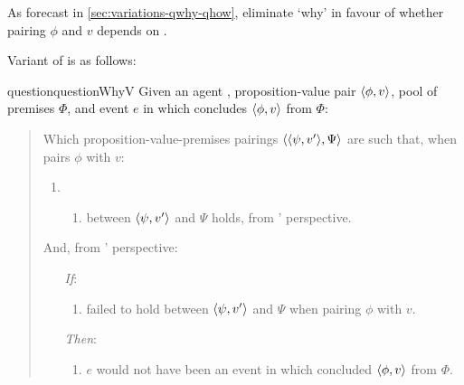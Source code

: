 \begin{note}
  As forecast in \autoref{sec:variations-qwhy-qhow}, eliminate `why' in favour of whether pairing \(\phi\) and \(v\) depends on \ros{}.
\end{note}

\begin{note}
  Variant of \qWhyV{} is as follows:

    \begin{restatable}[\qWhyV{}]{question}{questionWhyV}
    \label{q:why:v}
    Given an agent \vAgent{}, proposition-value pair \(\langle \phi, v \rangle\), pool of premises \(\Phi\), and event \(e\) in which \vAgent{} concludes \(\langle \phi, v \rangle\) from \(\Phi\):

    \begin{quote}
      Which proposition-value-premises pairings \(\langle \langle \psi, v' \rangle, \Psi \rangle\) are such that, when \vAgent{} pairs \(\phi\) with \(v\):

      \begin{enumerate}[label=]
      \item
        \begin{enumerate}[label=\alph*., ref=(\alph*), series=qWhyVDef]
        \item
          \label{q:why:v:a}
           between \(\langle \psi, v' \rangle\) and \(\Psi\) holds, from \vAgent{}' perspective.
        \end{enumerate}
      \end{enumerate}

      And, from \vAgent{}' perspective:

      \begin{enumerate}
      \item[\emph{If}:]
        \begin{enumerate}[label=\alph*., ref=(\alph*), resume*=qWhyVDef]
        \item
          \label{q:why:v:if}
           failed to hold between \(\langle \psi, v' \rangle\) and \(\Psi\) when pairing \(\phi\) with \(v\).
        \end{enumerate}
      \item[\emph{Then}:]
        \begin{enumerate}[label=\alph*., ref=(\alph*), resume*=qWhyVDef]
        \item
          \label{q:why:v:then}
          \(e\) would not have been an event in which \vAgent{} concluded \(\langle \phi, v \rangle\) from \(\Phi\).
        \end{enumerate}
      \end{enumerate}
    \end{quote}
    \vspace{-\baselineskip}
  \end{restatable}


\end{note}

